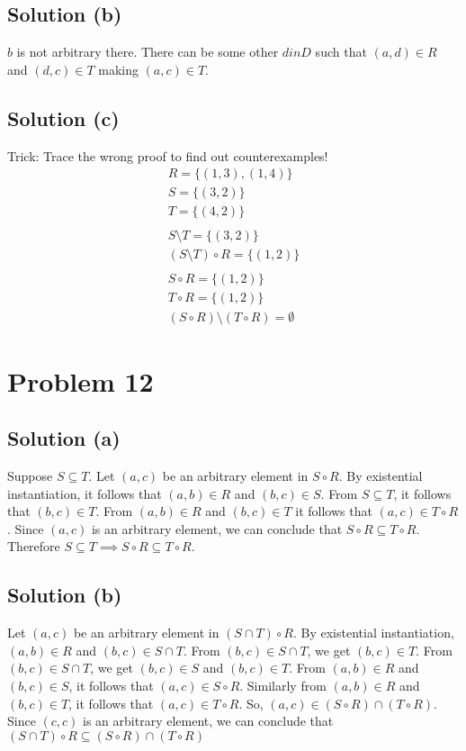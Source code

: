 \documentclass{article}
\begin{document}
\subsection{Solution (b)}
$b$ is not arbitrary there. There can be some other $d in D$ such that
$(a,d) \in R$ and $(d,c) \in T$ making $(a,c) \in T$.

\subsection{Solution (c)}
Trick: Trace the wrong proof to find out counterexamples!
\begin{align*}
R = \{(1,3),(1,4)\} \\
S = \{(3,2)\} \\
T = \{(4,2)\} \\ \\
S \setminus T = \{(3,2)\} \\
(S \setminus T) \circ R = \{(1,2)\} \\ \\
S \circ R = \{(1,2)\} \\
T \circ R = \{(1,2)\} \\
(S \circ R) \setminus (T \circ R) = \emptyset
\end{align*}

\section{Problem 12}

\subsection{Solution (a)}

Suppose $S \subseteq T$. Let $(a,c)$ be an arbitrary element in $S
\circ R$. By existential instantiation, it follows that $(a,b) \in R$
and $(b,c) \in S$. From $S \subseteq T$, it follows that $(b,c) \in
T$. From $(a,b) \in R$ and $(b,c) \in T$ it follows that $(a,c) \in T
\circ R$. Since $(a,c)$ is an arbitrary element, we can conclude that
$S \circ R \subseteq T \circ R$. Therefore $S \subseteq T \implies S
\circ R \subseteq T \circ R$.

\subsection{Solution (b)}

Let $(a,c)$ be an arbitrary element in $(S \cap T) \circ R$. By
existential instantiation, $(a,b) \in R$ and $(b,c) \in S \cap T$.
From $(b,c) \in S \cap T$, we get $(b,c) \in T$. From $(b,c) \in S
\cap T$, we get $(b,c) \in S$ and $(b,c) \in T$. From $(a,b) \in R$
and $(b,c) \in S$, it follows that $(a,c) \in S \circ R$. Similarly
from $(a,b) \in R$ and $(b,c) \in T$, it follows that $(a,c) \in T
\circ R$. So, $(a,c) \in (S \circ R) \cap (T \circ R)$. Since $(c,c)$
is an arbitrary element, we can conclude that $(S \cap T) \circ R
\subseteq (S \circ R) \cap (T \circ R)$
\end{document}
